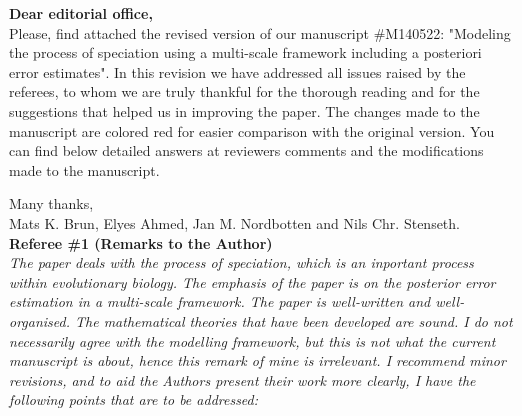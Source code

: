 \documentclass[a4paper,11pt]{scrartcl}
\date{}%
\begin{document}
\textbf{Dear editorial office,}\\

Please, find attached the revised version of our manuscript \#M140522: "Modeling the process of speciation using a multi-scale framework including a posteriori error estimates". In this revision we have addressed all issues raised by the referees, to whom we are truly thankful for the thorough reading and for the suggestions that helped us in improving the paper. The changes made to the manuscript are colored red for easier comparison with the original version. You can find below detailed answers at reviewers comments and the modifications made to the manuscript.

Many thanks,\\
\hspace*{2cm}Mats K. Brun, Elyes Ahmed, Jan M. Nordbotten and Nils Chr. Stenseth.\\[2ex]

\textbf{ Referee \#1  (Remarks to the Author)}\\

\textit{The paper deals with the process of speciation, which is an inportant process within evolutionary biology. The emphasis of the paper is on the posterior error estimation in a multi-scale framework. The paper is well-written and well-organised. The mathematical theories that have been developed are sound. I do not necessarily agree with the modelling framework, but this is not what the current manuscript is about, hence this remark of mine is irrelevant. I recommend minor revisions, and to aid the Authors present their work more clearly, I have the following points that are to be addressed:}
\end{document}
